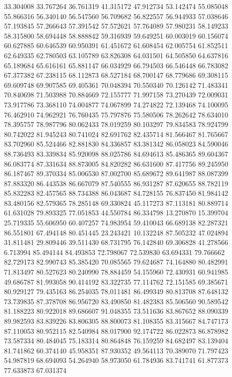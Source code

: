 33.304008
33.767264
36.761319
41.315172
47.912734
53.142474
55.085048
55.866316
56.340140
56.547560
56.709682
56.822557
56.944933
57.038646
57.193845
57.266643
57.391542
57.572621
57.764089
57.980231
58.149233
58.315800
58.694448
58.888842
59.316939
59.649251
60.003019
60.156074
60.627885
60.646539
60.950391
61.451672
61.608454
62.005754
61.852511
62.649335
62.780503
63.105789
63.826308
64.031501
64.505850
64.637816
65.189684
65.616161
65.881147
66.034929
66.794503
66.546448
66.783082
67.377382
67.238115
68.112873
68.527184
68.700147
68.779686
69.308115
69.609748
69.907585
69.405361
70.048394
70.550340
70.126142
71.483341
70.840698
71.503988
70.884669
72.155777
71.997158
73.270439
72.009031
73.917786
73.368110
74.004877
74.067899
74.274822
72.139468
74.100095
76.462910
74.962921
76.760435
75.797876
75.580506
78.262642
78.634010
78.395757
78.987796
80.062433
78.019259
80.103297
79.834583
78.924799
80.742022
81.945243
80.741024
82.691762
82.435714
81.566467
81.765667
83.702960
85.524466
82.881830
84.336857
83.381342
86.058023
84.590046
88.736493
83.339834
85.920098
88.025786
84.694613
85.486365
89.604367
86.083774
87.331634
88.873005
84.820282
86.631600
87.417756
89.245950
86.187467
89.370334
85.006530
87.002700
85.689672
89.641987
88.087399
87.883320
86.443538
86.667079
87.540555
86.931287
87.620655
88.782119
85.832283
82.457565
88.734388
86.043687
84.728155
76.837450
81.984142
83.480156
82.579365
78.285148
69.330824
45.117273
87.113181
80.889714
61.631028
79.893325
77.051853
44.550784
86.334798
13.270870
15.399704
25.719335
55.606950
60.407257
74.983954
59.410043
66.689138
82.287321
86.551801
67.494148
80.451445
23.243421
10.132248
87.505232
47.024894
31.811481
29.809446
39.511430
68.731795
76.142840
69.306828
41.278566
6.713994
85.494144
84.493853
72.798067
72.539830
63.694331
79.766662
82.729173
82.990743
85.385420
70.085565
79.624687
74.164880
80.482991
71.813497
80.527623
80.240990
78.884459
54.155960
72.430931
60.941985
49.686787
81.993058
90.414192
83.322735
77.114762
72.151585
69.385671
80.929127
79.435163
86.254035
78.011481
86.499349
80.813708
87.648132
73.739835
87.378708
86.956720
83.490850
81.482383
85.506560
90.589542
81.188223
80.922018
89.686607
91.048355
73.511636
83.867652
88.090339
89.982593
83.839226
83.806305
88.800073
81.108355
83.315667
84.747173
87.110053
80.952115
82.540984
88.017900
92.174722
86.022873
86.878982
73.587334
80.484045
75.183314
80.864848
76.159259
84.682497
83.139404
81.741862
60.374140
45.958351
87.930352
49.564113
70.389070
71.797423
54.987819
68.694093
54.264940
58.973050
61.784936
83.741741
61.877373
77.633873
67.031374
